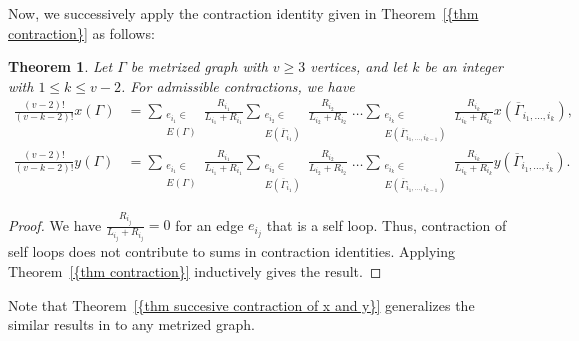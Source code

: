 \documentclass[12pt]{amsart}
\newtheorem{theorem}{Theorem}[section]
\theoremstyle{example}
\theoremstyle{definition}
\theoremstyle{notation}
\begin{document}
Now, we successively apply the contraction identity given in {Theorem~\ref{{thm contraction}}} as follows:
\begin{theorem}\label{thm succesive contraction of x and y}
Let ${\Gamma}$ be metrized graph with $v \geq 3$ vertices, and let $k$ be an integer with $1 \leq k \leq v-2$. For admissible contractions, we have
\begin{equation*}
\begin{split}
\frac{(v-2)!}{(v-k-2)!}x({\Gamma}) &= \sum_{\substack{e_{i_1} \in
\\ {E({\Gamma})}}}\frac{R_{i_1}}{L_{i_1}+R_{i_1}} \sum_{\substack{e_{i_2} \in
\\ {E({{{\overline{\Gamma}}}_{i_1}})}}}\frac{R_{i_2}}{L_{i_2}+R_{i_2}}
\; \dots
\sum_{ \substack{e_{i_k} \in
\\ {E({{{\overline{\Gamma}}}_{i_1, \dots, i_{k-1}}})}} }
\frac{R_{i_k}}{L_{i_k}+R_{i_k}} x({{\overline{\Gamma}}}_{i_1,\dots, i_k}),\\
\frac{(v-2)!}{(v-k-2)!}y({\Gamma}) &= \sum_{\substack{e_{i_1} \in
\\ {E({\Gamma})}}}\frac{R_{i_1}}{L_{i_1}+R_{i_1}} \sum_{\substack{e_{i_2} \in
\\ {E({{{\overline{\Gamma}}}_{i_1}})}}}\frac{R_{i_2}}{L_{i_2}+R_{i_2}}
\; \dots
\sum_{ \substack{e_{i_k} \in
\\ {E({{{\overline{\Gamma}}}_{i_1, \dots, i_{k-1}}})}} }
\frac{R_{i_k}}{L_{i_k}+R_{i_k}} y({{\overline{\Gamma}}}_{i_1,\dots, i_k}).
\end{split}
\end{equation*}
\end{theorem}
\begin{proof}
We have $\frac{R_{i_j}}{L_{i_j}+R_{i_j}}=0$ for an edge $e_{i_j}$ that is a self loop. Thus, contraction of self loops
does not contribute to sums in contraction identities.
Applying {Theorem~\ref{{thm contraction}}} inductively gives the result.
\end{proof}
Note that {Theorem~\ref{{thm succesive contraction of x and y}}} generalizes the similar results in \cite{C5} to any metrized graph.
\end{document}
